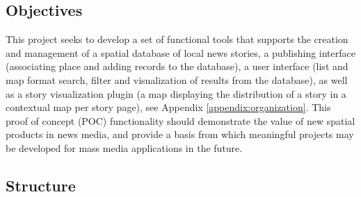 \subsection{Objectives}

This project seeks to develop a set of functional tools that supports the creation and management of a spatial database of local news stories, a publishing interface (associating place and adding records to the database), a user interface (list and map format search, filter and visualization of results from the database), as well as a story visualization plugin (a map displaying the distribution of a story in a contextual map per story page), see Appendix \ref{appendix:organization}. This proof of concept (POC) functionality should demonstrate the value of new spatial products in news media, and provide a basis from which meaningful projects may be developed for mass media applications in the future.

\subsection{Structure}

